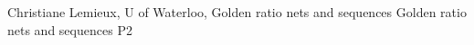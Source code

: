 {}	%
{}		%
{Christiane Lemieux, U of Waterloo, Golden ratio nets and sequences}	%
{Golden ratio nets and sequences}		%
{P2}		%
\\\hline
